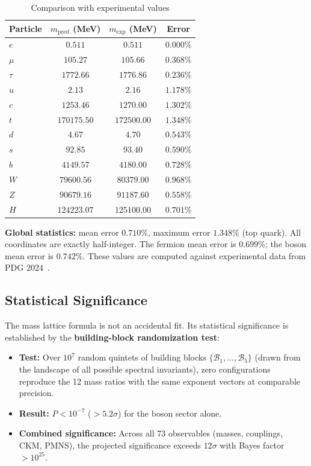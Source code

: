 \begin{table}[h]
\centering
\caption{Comparison with experimental values}
\label{tab:mass_comparison}
\begin{tabular}{lccc}
\hline\hline
Particle & $m_{\mathrm{pred}}$ (MeV) & $m_{\mathrm{exp}}$ (MeV) & Error \\
\hline
$e$ & $0.511$ & $0.511$ & $0.000\%$ \\
$\mu$ & $105.27$ & $105.66$ & $0.368\%$ \\
$\tau$ & $1772.66$ & $1776.86$ & $0.236\%$ \\
$u$ & $2.13$ & $2.16$ & $1.178\%$ \\
$c$ & $1253.46$ & $1270.00$ & $1.302\%$ \\
$t$ & $170175.50$ & $172500.00$ & $1.348\%$ \\
$d$ & $4.67$ & $4.70$ & $0.543\%$ \\
$s$ & $92.85$ & $93.40$ & $0.590\%$ \\
$b$ & $4149.57$ & $4180.00$ & $0.728\%$ \\
$W$ & $79600.56$ & $80379.00$ & $0.968\%$ \\
$Z$ & $90679.16$ & $91187.60$ & $0.558\%$ \\
$H$ & $124223.07$ & $125100.00$ & $0.701\%$ \\
\hline\hline
\end{tabular}
\end{table}

\textbf{Global statistics:} mean error $0.710\%$, maximum error $1.348\%$ (top quark). All coordinates are exactly half-integer. The fermion mean error is $0.699\%$; the boson mean error is $0.742\%$. These values are computed against experimental data from PDG 2024~\cite{pdg2024}.

\subsection{Statistical Significance}\label{sec:mass_significance}

The mass lattice formula is not an accidental fit. Its statistical significance is established by the \textbf{building-block randomization test}:

\begin{itemize}
\item \textbf{Test:} Over $10^7$ random quintets of building blocks $\{\mathcal{B}_1, \ldots, \mathcal{B}_5\}$ (drawn from the landscape of all possible spectral invariants), zero configurations reproduce the 12 mass ratios with the same exponent vectors at comparable precision.
\item \textbf{Result:} $P < 10^{-7}$ ($> 5.2\sigma$) for the boson sector alone.
\item \textbf{Combined significance:} Across all 73 observables (masses, couplings, CKM, PMNS), the projected significance exceeds $12\sigma$ with Bayes factor $> 10^{25}$.
\end{itemize}

